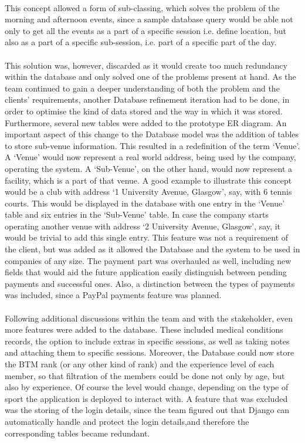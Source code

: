 \documentclass{l3proj}
\begin{document}
\\
This concept allowed a form of sub-classing, which solves the problem of the morning and afternoon events, since a sample database query would be able not only to get all the events as a part of a specific session i.e. define location, but also as a part of a specific sub-session, i.e. part of a specific part of the day.\\
\\This solution was, however, discarded as it would create too much redundancy within the database and only solved one of the problems present at hand. As the team continued to gain a deeper understanding of both the problem and the clients' requirements, another Database refinement iteration had to be done, in order to optimise the kind of data stored and the way in which it was stored. Furthermore, several new tables were added to the prototype ER diagram. An important aspect of this change to the Database model was the addition of tables to store sub-venue information. This resulted in a redefinition of the term `Venue'. A `Venue' would now represent a real world address, being used by the company, operating the system. A `Sub-Venue', on the other hand, would now represent a facility, which is a part of that venue. A good example to illustrate this concept would be a club with address `1 University Avenue, Glasgow', say, with 6 tennis courts. This would be displayed in the database with one entry in the `Venue' table and six entries in the `Sub-Venue' table. In case the company starts operating another venue with address `2 University Avenue, Glasgow', say, it would be trivial to add this single entry. This feature was not a requirement of the client, but was added as it allowed the Database and the system to be used in companies of any size. The payment part was overhauled as well, including new fields that would aid the future application easily distinguish between pending payments and successful ones. Also, a distinction between the types of payments was included, since a PayPal payments feature was planned.\\
\\Following additional discussions within the team and with the stakeholder, even more features were added to the database. These included medical conditions records, the option to include extras in specific sessions, as well as taking notes and attaching them to specific sessions. Moreover, the Database could now store the BTM rank (or any other kind of rank) and the experience level of each member, so that filtration of the members could be done not only by age, but also by experience.  Of course the level would change, depending on the type of sport the application is deployed to interact with. A feature that was excluded was the storing of the login details, since the team figured out that Django can automatically handle and protect the login details,and therefore the corresponding tables became redundant.\\
\end{document}
